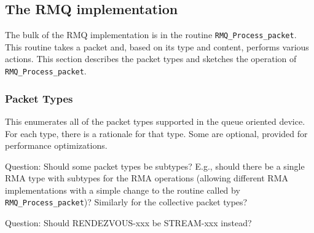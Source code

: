 \documentclass{article}
\let\code=\texttt
\begin{document}
\subsection{The RMQ implementation}
The bulk of the RMQ implementation is in the routine
\code{RMQ\_Process\_packet}.  This routine takes a packet and, based on its
type and content, performs various actions.  This section describes the packet
types and sketches the operation of \code{RMQ\_Process\_packet}.

\subsubsection{Packet Types}
This enumerates all of the packet types supported in the queue oriented
device.  For each type, there is a rationale for that type.  Some are
optional, provided for performance optimizations.

Question:  Should some packet types be subtypes?  E.g., should there be a
single RMA type with subtypes for the RMA operations (allowing different RMA
implementations with a simple change to the routine called by 
\code{RMQ\_Process\_packet})? Similarly for the collective packet types?

Question: Should RENDEZVOUS-xxx be STREAM-xxx instead?
\end{document}
